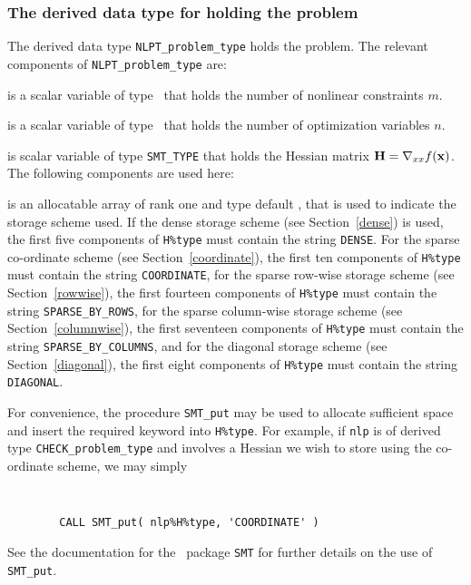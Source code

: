 \documentclass{galahad}
\newcommand{\packagename}{CHECK}
\begin{document}

\subsubsection{The derived data type for holding the problem}\label{typeprob}
The derived data type {\tt NLPT\_problem\_type} holds 
the problem. The relevant components of 
{\tt NLPT\_problem\_type} 
are:

\begin{description}

 is a scalar variable of type \integer\ 
 that holds the number of nonlinear constraints $m$.  

 is a scalar variable of type \integer\ 
 that holds the number of optimization variables $n$.  
              
\ittf{H} is scalar variable of type {\tt SMT\_TYPE} 
that holds the Hessian matrix ${\mathbf{H}}=\nabla_{xx}f({\mathbf{x}})$. The following components
are used here:

\begin{description}

 is an allocatable array of rank one and type default 
\character, that
is used to indicate the storage scheme used. If the dense storage scheme 
(see Section~\ref{dense}) is used, 
the first five components of {\tt H\%type} must contain the
string {\tt DENSE}.
For the sparse co-ordinate scheme (see Section~\ref{coordinate}), 
the first ten components of {\tt H\%type} must contain the
string {\tt COORDINATE},  
for the sparse row-wise storage scheme (see Section~\ref{rowwise}),
the first fourteen components of {\tt H\%type} must contain the
string {\tt SPARSE\_BY\_ROWS},
for the sparse column-wise storage scheme (see Section~\ref{columnwise}),
the first seventeen components of {\tt H\%type} must contain the
string {\tt SPARSE\_BY\_COLUMNS},
and for the diagonal storage scheme (see Section~\ref{diagonal}),
the first eight components of {\tt H\%type} must contain the
string {\tt DIAGONAL}.

For convenience, the procedure {\tt SMT\_put} 
may be used to allocate sufficient space and insert the required keyword
into {\tt H\%type}.
For example, if {\tt nlp} is of derived type {\tt \packagename\_problem\_type}
and involves a Hessian we wish to store using the co-ordinate scheme,
we may simply
{\tt 
\begin{verbatim}
        CALL SMT_put( nlp%H%type, 'COORDINATE' )
\end{verbatim}
}
\noindent
See the documentation for the \galahad\ package {\tt SMT} 
for further details on the use of {\tt SMT\_put}.


\end{description}
\end{description}
\end{document}

